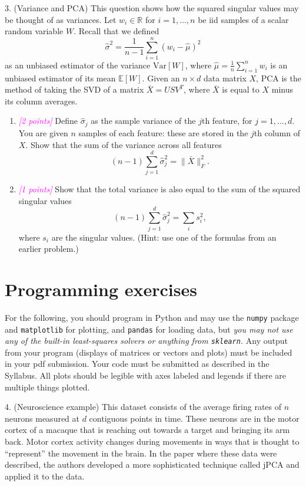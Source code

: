 \documentclass{article}
\newcommand{\R}{\mathbb{R}} %
\newcommand{\points}[1]{\small\textcolor{magenta}{\emph{[#1 points]}} \normalsize}
\begin{document}
3. (Variance and PCA)
This question shows how the squared singular values may be thought of as variances.
Let $w_i \in \R$ for $i = 1, \ldots, n$ be iid samples of a scalar random variable $W$.
Recall that we defined
\begin{equation}
  \label{eq:sample_var}
  \hat{\sigma}^2 = \frac{1}{n-1} \sum_{i=1}^n (w_i - \hat{\mu})^2
\end{equation}
as an unbiased estimator of the variance $\mathrm{Var}[W]$, where $\hat{\mu} = \frac{1}{n} \sum_{i=1}^n w_i$
is an unbiased estimator of its mean $\mathbb{E}[W]$.
Given an $n \times d$ data matrix $X$,
PCA is the method of taking the SVD of a matrix $\bar{X} = USV^T$, where
$\bar{X}$ is equal to $X$ minus its column averages.
\begin{enumerate}
\item \points{2} Define $\hat{\sigma}_j$ as the sample variance of the $j$th feature,
  for $j = 1, \ldots, d$.
  You are given $n$ samples of each feature: these are stored in the $j$th column of $X$.
  Show that the sum of the variance across all features
  $$
  (n-1) \sum_{j=1}^d \hat{\sigma}_j^2 = \| \bar X \|_F^2.
  $$
\item \points{1} Show that the total variance is also equal to the sum of the squared singular values
  $$
  (n-1) \sum_{j=1}^d \hat{\sigma}_j^2 = \sum_{i} s_i^2,
  $$
  where $s_i$ are the singular values. (Hint: use one of the formulas from an earlier problem.)
\end{enumerate}


\section*{Programming exercises}

For the following, you should program in Python and may use the
{\tt numpy} package and {\tt matplotlib} for plotting, and {\tt pandas} for loading data,
but {\em you may not use any of the built-in least-squares solvers or anything from {\tt sklearn}.}
Any output from your program (displays of matrices or vectors and plots) 
must be included in your pdf submission.
Your code must be submitted as described in the Syllabus.
All plots should be legible with axes labeled and legends if there are multiple things plotted.

\vspace{1em}
4. (Neuroscience example)
This dataset consists of the average firing rates of $n$ neurons measured at $d$ contiguous points in time.
These neurons are in the motor cortex of a macaque that is reaching out towards a target 
and bringing its arm back.
Motor cortex activity changes during movements in ways that is thought to ``represent''
the movement in the brain.
In the paper where these data were described, the authors developed a more sophisticated technique
called jPCA and applied it to the data.
\end{document}
